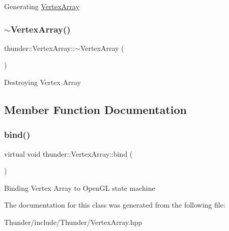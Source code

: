 Generating \mbox{\hyperlink{classthunder_1_1_vertex_array}{Vertex\+Array}} \mbox{\label{classthunder_1_1_vertex_array_aa63130e78454cd2ad4bd956c052a4e8d}} 
\subsubsection{\texorpdfstring{$\sim$\+Vertex\+Array()}{~VertexArray()}}
{\footnotesize\ttfamily thunder\+::\+Vertex\+Array\+::$\sim$\+Vertex\+Array (\begin{DoxyParamCaption}{ }\end{DoxyParamCaption})}

Destroying Vertex Array 

\subsection{Member Function Documentation}
\mbox{\label{classthunder_1_1_vertex_array_ac2b471ab36646b1764bf2c27444fd871}} 
\subsubsection{\texorpdfstring{bind()}{bind()}}
{\footnotesize\ttfamily virtual void thunder\+::\+Vertex\+Array\+::bind (\begin{DoxyParamCaption}{ }\end{DoxyParamCaption})\hspace{0.3cm}{\ttfamily [virtual]}}

Binding Vertex Array to Open\+GL state machine 

The documentation for this class was generated from the following file\+:\begin{DoxyCompactItemize}
\item 
Thunder/include/\+Thunder/Vertex\+Array.\+hpp\end{DoxyCompactItemize}
